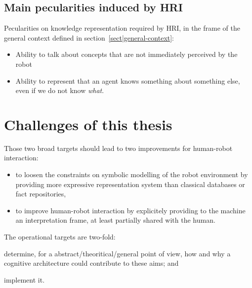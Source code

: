 \subsection{Main pecularities induced by HRI}
\label{sect|pecularities-krs-for-hri}

Pecularities on knowledge representation required by HRI, in the frame of the
general context defined in section~\ref{sect|general-context}:

\begin{itemize}

	\item Ability to talk about concepts that are not immediately perceived by
	the robot

	\item {} Ability to represent that an agent knows something about
	something else, even if we do not know \emph{what}.

\end{itemize}

\section{Challenges of this thesis}
\label{sect|krs-challenges}

Those two broad targets should lead to two improvements for human-robot
interaction:


\begin{itemize}
	\item to loosen the constraints on symbolic modelling of the robot
	environment by providing more expressive representation system than
	classical databases or fact repositories,

	\item to improve human-robot interaction by explicitely providing to the
	machine an interpretation frame, at least partially shared with the human.

\end{itemize}

The operational targets are two-fold:

\begin{inparaenum}

	\item determine, for a abstract/theoritical/general point of view, how and
	why a cognitive architecture could contribute to these aims; and

	\item implement it.

\end{inparaenum}

